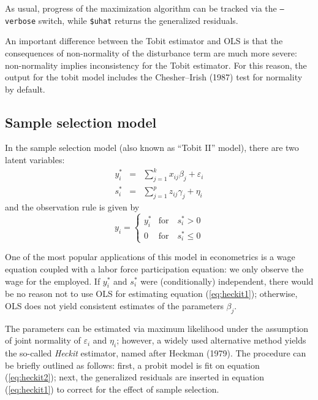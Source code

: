 As usual, progress of the maximization algorithm can be tracked via
the \texttt{--verbose} switch, while \verb+$uhat+ returns the
generalized residuals.

An important difference between the Tobit estimator and OLS is that
the consequences of non-normality of the disturbance term are much
more severe: non-normality implies inconsistency for the Tobit
estimator. For this reason, the output for the tobit model includes
the Chesher--Irish (1987) test for normality by default.

\subsection{Sample selection model}
\label{sec:heckit}

In the sample selection model (also known as ``Tobit II'' model),
there are two latent variables:
%
\begin{eqnarray}
  \label{eq:heckit1}
  y^*_i & = & \sum_{j=1}^k x_{ij} \beta_j + \varepsilon_i \\
  \label{eq:heckit2}
  s^*_i & = & \sum_{j=1}^p z_{ij} \gamma_j + \eta_i 
\end{eqnarray}
%
and the observation rule is given by
%
\begin{equation}
  \label{eq:tobitII}
  y_i = \left\{ 
    \begin{array}{ll} 
      y^*_i & \mathrm{for} \quad s^*_i > 0 \\ 
      0 & \mathrm{for} \quad s^*_i \le 0 
    \end{array}
    \right. 
\end{equation}

One of the most popular applications of this model in econometrics is
a wage equation coupled with a labor force participation equation: we
only observe the wage for the employed. If $y^*_i$ and $s^*_i$ were
(conditionally) independent, there would be no reason not to use OLS
for estimating equation (\ref{eq:heckit1}); otherwise, OLS does not
yield consistent estimates of the parameters $\beta_j$.

The parameters can be estimated via maximum likelihood under the
assumption of joint normality of $\varepsilon_i$ and $\eta_i$;
however, a widely used alternative method yields the so-called
\emph{Heckit} estimator, named after Heckman (1979). The procedure can
be briefly outlined as follows: first, a probit model is fit on
equation (\ref{eq:heckit2}); next, the generalized residuals are
inserted in equation (\ref{eq:heckit1}) to correct for the effect of
sample selection.


